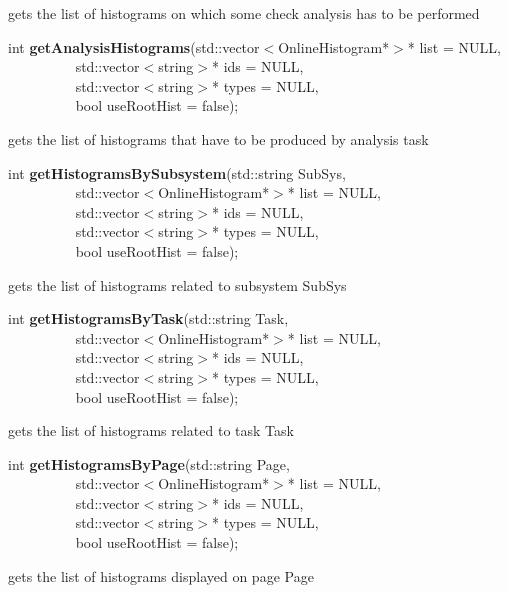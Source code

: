  gets the list of histograms on which some check analysis has to be performed 


\item    int {\bf getAnalysisHistograms}(std::vector$<$OnlineHistogram*$>$* list = NULL,\\\mbox{}~~~~~~~~~
			    std::vector$<$string$>$* ids = NULL,\\\mbox{}~~~~~~~~~
			    std::vector$<$string$>$* types = NULL,\\\mbox{}~~~~~~~~~
			    bool useRootHist = false);

 gets the list of histograms that have to be produced by analysis task


\item    int {\bf getHistogramsBySubsystem}(std::string SubSys,\\\mbox{}~~~~~~~~~
			       std::vector$<$OnlineHistogram*$>$* list = NULL,\\\mbox{}~~~~~~~~~
			       std::vector$<$string$>$* ids = NULL,\\\mbox{}~~~~~~~~~
			       std::vector$<$string$>$* types = NULL,\\\mbox{}~~~~~~~~~
			       bool useRootHist = false);

 gets the list of histograms related to subsystem SubSys


\item    int {\bf getHistogramsByTask}(std::string Task,\\\mbox{}~~~~~~~~~
			  std::vector$<$OnlineHistogram*$>$* list = NULL,\\\mbox{}~~~~~~~~~
			  std::vector$<$string$>$* ids = NULL,\\\mbox{}~~~~~~~~~
			  std::vector$<$string$>$* types = NULL,\\\mbox{}~~~~~~~~~
			  bool useRootHist = false);

 gets the list of histograms related to task Task


\item    int {\bf getHistogramsByPage}(std::string Page,\\\mbox{}~~~~~~~~~
			  std::vector$<$OnlineHistogram*$>$* list = NULL,\\\mbox{}~~~~~~~~~
			  std::vector$<$string$>$* ids = NULL,\\\mbox{}~~~~~~~~~
			  std::vector$<$string$>$* types = NULL,\\\mbox{}~~~~~~~~~
			  bool useRootHist = false);

 gets the list of histograms displayed on page Page


